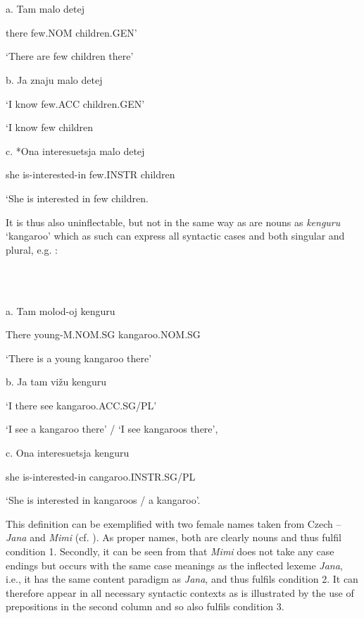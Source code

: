 \documentclass[output=paper]{langscibook}
\begin{document}
\ea%
    \label{ex:key:1}
    \gll \\
         \\
    \glt
    \z %

         a. Tam malo detej 

          there few.NOM children.GEN’

         ‘There are few children there’

b. Ja znaju malo detej 

    ‘I know few.ACC children.GEN’ 

    ‘I know few children

c. *Ona interesuetsja malo detej 

      she is-interested-in few.INSTR children 

      ‘She is interested in few children. 

It is thus also uninflectable, but not in the same way as are nouns as \textit{kenguru} ‘kangaroo’ which as such can express all syntactic cases and both singular and plural, e.g. : 

\ea%
    \label{ex:key:2}
    \gll \\
         \\
    \glt
    \z %

         a. Tam molod-oj kenguru  

         There young-M.NOM.SG kangaroo.NOM.SG

         ‘There is a young kangaroo there’

b.    Ja tam vižu kenguru 

      ‘I there see kangaroo.ACC.SG/PL’

      ‘I see a kangaroo there’ / ‘I see kangaroos there’, 

c.    Ona interesuetsja kenguru 

      she is-interested-in cangaroo.INSTR.SG/PL

      ‘She is interested in kangaroos / a kangaroo’. 

This definition can be exemplified with two female names taken from Czech – \textit{Jana} and \textit{Mimi} (cf. ). As proper names, both are clearly nouns and thus fulfil condition 1. Secondly, it can be seen from  that \textit{Mimi} does not take any case endings but occurs with the same case meanings as the inflected lexeme \textit{Jana}, i.e., it has the same content paradigm as \textit{Jana}, and thus fulfils condition 2. It can therefore appear in all necessary syntactic contexts as is illustrated by the use of prepositions in the second column and so also fulfils condition 3.
\end{document}
